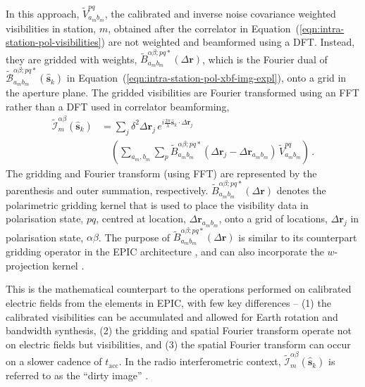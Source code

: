 \documentclass[
  journal=pasa,
  manuscript=article-type,
  year=2020,
  volume=37,
]{cup-journal}
\begin{document}
In this approach, $\widetilde{V}_{a_m b_m}^{pq}$, the calibrated and inverse noise covariance weighted visibilities in station, $m$, obtained after the correlator in Equation~(\ref{eqn:intra-station-pol-visibilities}) are not weighted and beamformed using a DFT. Instead, they are gridded with weights, $\widetilde{B}_{a_m b_m}^{\alpha\beta;pq*}(\Delta\boldsymbol{r})$, which is the Fourier dual of $\widetilde{\mathcal{B}}_{a_m b_m}^{\alpha\beta;pq*}(\hat{\boldsymbol{s}}_k)$ in Equation~(\ref{eqn:intra-station-pol-xbf-img-expl}), onto a grid in the aperture plane. The gridded visibilities are Fourier transformed using an FFT rather than a DFT used in correlator beamforming,
\begin{align}
  \widetilde{\mathcal{I}}_m^{\alpha\beta}(\hat{\boldsymbol{s}}_k) &= \sum_j \delta^2 \Delta\boldsymbol{r}_j \, e^{i\frac{2\pi}{\lambda} \hat{\boldsymbol{s}}_k\cdot\Delta\boldsymbol{r}_j} \nonumber\\
  &\quad \left(\sum_{a_m,b_m} \sum_p \widetilde{B}_{a_m b_m}^{\alpha\beta;pq*}(\Delta\boldsymbol{r}_j-\Delta\boldsymbol{r}_{a_m b_m}) \, \widetilde{V}_{a_m b_m}^{pq} \right) \, . \label{eqn:intra-station-pol-img-xfft-expl}
\end{align}
The gridding and Fourier transform (using FFT) are represented by the parenthesis and outer summation, respectively. $\widetilde{B}_{a_m b_m}^{\alpha\beta;pq*}(\Delta\boldsymbol{r})$ denotes the polarimetric gridding kernel that is used to place the visibility data in polarisation state, $pq$, centred at location, $\Delta\boldsymbol{r}_{a_m b_m}$, onto a grid of locations, $\Delta\boldsymbol{r}_j$ in polarisation state, $\alpha\beta$. The purpose of $\widetilde{B}_{a_m b_m}^{\alpha\beta;pq*}(\Delta\boldsymbol{r})$ is similar \citep{Morales+2009,Bhatnagar+2008} to its counterpart gridding operator in the EPIC architecture \citep{Morales2011}, and can also incorporate the $w$-projection kernel \citep{Cornwell+2008}.

This is the mathematical counterpart to the operations performed on calibrated electric fields from the elements in EPIC, with few key differences -- (1) the calibrated visibilities can be accumulated and allowed for Earth rotation and bandwidth synthesis, (2) the gridding and spatial Fourier transform operate not on electric fields but visibilities, and (3) the spatial Fourier transform can occur on a slower cadence of $t_\textrm{acc}$.
In the radio interferometric context, $\widetilde{\mathcal{I}}_m^{\alpha\beta}(\hat{\boldsymbol{s}}_k)$ is referred to as the ``dirty image'' \citep{TMS2017,SIRA-II}. 
\end{document}
